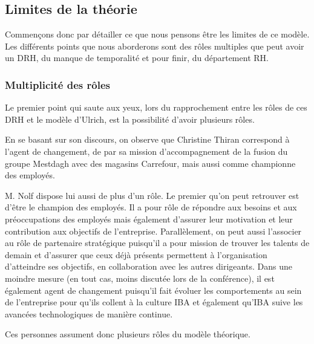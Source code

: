 \subsection{Limites de la théorie}

Commençons donc par détailler ce que nous pensons être les limites de ce modèle. Les différents points que nous aborderons sont des rôles multiples que peut avoir un DRH, du manque de temporalité et pour finir, du département RH.\newline

\subsubsection*{Multiplicité des rôles} 

Le premier point qui saute aux yeux, lors du rapprochement entre les rôles de ces DRH et le modèle d'Ulrich, est la possibilité d'avoir plusieurs rôles. \newline

En se basant sur son discours, on observe que Christine Thiran correspond à l'\og{}agent de changement\fg{}, de par sa mission d'accompagnement de la fusion du groupe Mestdagh avec des magasins Carrefour, mais aussi comme \og{}championne des employés\fg{}. \newline

M. Nolf dispose lui aussi de plus d'un rôle. Le premier qu'on peut retrouver est d'être le \og{}champion des employés\fg{}. Il a pour rôle de répondre aux besoins et aux préoccupations des employés mais également d'assurer leur motivation et leur contribution aux objectifs de l'entreprise. Parallèlement, on peut aussi l'associer au rôle de \og{}partenaire stratégique \fg{} puisqu'il a pour mission de trouver les talents de demain et d'assurer que ceux déjà présents permettent à l'organisation d'atteindre ses objectifs, en collaboration avec les autres dirigeants. Dans une moindre mesure (en tout cas, moins discutée lors de la conférence), il est également \og{}agent de changement\fg{} puisqu'il fait évoluer les comportements au sein de l'entreprise pour qu'ils collent à la culture IBA et également qu'IBA suive les avancées technologiques de manière continue. 

Ces personnes assument donc plusieurs rôles du modèle théorique. \\

